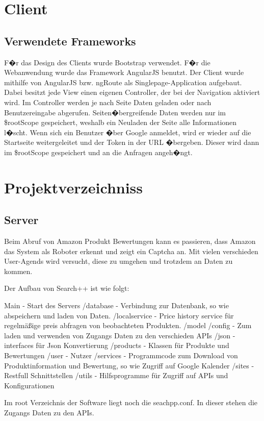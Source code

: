\chapter{Client}
\section{Verwendete Frameworks}
F�r das Design des Clients wurde Bootstrap verwendet. F�r die Webanwendung wurde das Framework AngularJS benutzt. Der Client wurde mithilfe von AngularJS bzw. ngRoute als Singlepage-Application aufgebaut. Dabei besitzt jede View einen eigenen Controller, der bei der Navigation aktiviert wird. Im Controller werden je nach Seite Daten geladen oder nach Benutzereingabe abgerufen. Seiten�bergreifende Daten werden nur im \$rootScope gespeichert, weshalb ein Neuladen der Seite alle Informationen l�scht. Wenn sich ein Benutzer �ber Google anmeldet, wird er wieder auf die Startseite weitergeleitet und der Token in der URL �bergeben. Dieser wird dann im \$rootScope gespeichert und an die Anfragen angeh�ngt.

\chapter{Projektverzeichniss}

\section{Server}
Beim Abruf von Amazon Produkt Bewertungen kann es passieren, dass Amazon das System als Roboter erkennt und zeigt ein Captcha an.
Mit vielen verschieden User-Agends wird versucht, diese zu umgehen und trotzdem an Daten zu kommen.


Der Aufbau von Search++ ist wie folgt:

Main          - Start des Servers
/database     - Verbindung zur Datenbank, so wie abspeichern und laden von Daten.
/localservice - Price history service für regelmäßige preis abfragen von beobachteten Produkten.
/model
  /config     - Zum laden und verwenden von Zugangs Daten zu den verschieden APIs
  /json       - interfaces für Json Konvertierung
  /products   - Klassen für Produkte und Bewertungen
  /user       - Nutzer
/services     - Programmcode zum Download von Produktinformation und Bewertung, so wie Zugriff auf Google Kalender
/sites        - Restfull Schnittstellen
/utils        - Hilfsprogramme für Zugriff auf APIs und Konfigurationen

Im root Verzeichnis der Software liegt noch die seachpp.conf. In dieser stehen die Zugangs Daten zu den APIs.